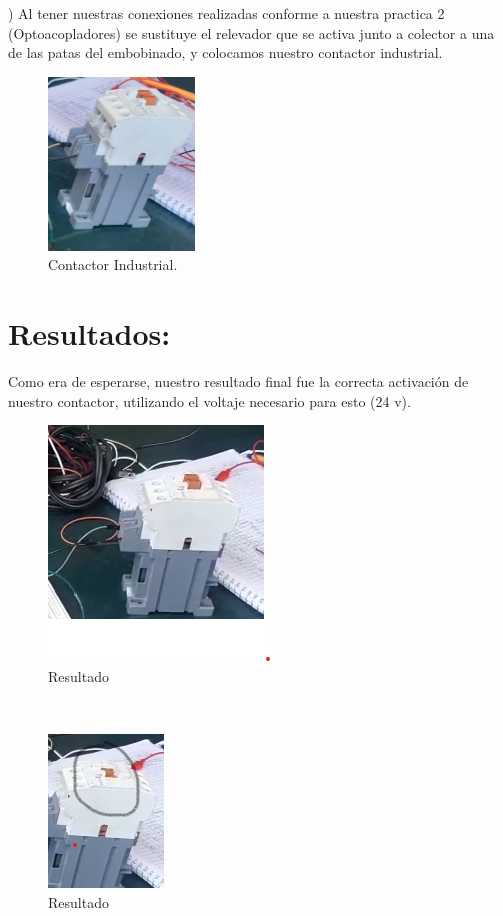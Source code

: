 \documentclass[14pt,letterpaper]{article}
\begin{document}
)	Al tener nuestras conexiones realizadas conforme a nuestra practica 2  (Optoacopladores) se sustituye el relevador que se activa junto a colector a una de las patas del embobinado, y colocamos nuestro contactor industrial.
\
\begin{figure}[h!]
\begin{center}
\includegraphics[scale=1]{ContactorIndustrial.png} 
\caption{Contactor Industrial.}
\end{center}
\end{figure}



\section{Resultados:}
Como era de esperarse, nuestro resultado final fue la correcta activación de nuestro contactor, utilizando el voltaje necesario para esto (24 v).
\
\begin{figure}[h!]
\begin{center}
\includegraphics[scale=0.5]{ContactorIndustrial1.png}
\caption{Resultado} 
\end{center}
\end{figure}

\
\begin{figure}[h!]
\begin{center}
\includegraphics[scale=1]{ContactorIndustrial2.png}
\caption{Resultado}
\end{center}
\end{figure}
\end{document}
